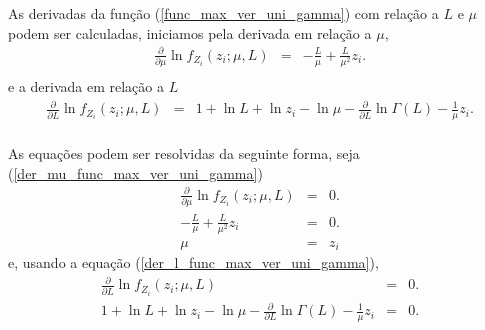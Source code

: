 \documentclass[remotesensing,article,submit,moreauthors,pdftex]{Definitions/mdpi}
\begin{document}
As derivadas da função (\ref{func_max_ver_uni_gamma}) com relação a $L$ e $\mu$ podem ser calculadas, iniciamos pela derivada em relação a $\mu$,
\begin{equation}\label{der_mu_func_max_ver_uni_gamma}
\begin{array}{ccc}
	\frac{\partial}{\partial \mu}\ln f_{Z_{i}}(z_{i};\mu,L)&=& -\frac{L}{\mu} + \frac{L}{\mu^2} z_i.\\
\end{array}
\end{equation}
e a derivada em relação a $L$
\begin{equation}\label{der_l_func_max_ver_uni_gamma}
\begin{array}{ccc}
	\frac{\partial}{\partial L}\ln f_{Z_{i}}(z_{i};\mu,L)&=&1 + \ln L + \ln z_{i}-\ln \mu -\frac{\partial}{\partial L}\ln \Gamma(L)-\frac{1}{\mu} z_i.\\
\end{array}
\end{equation}

As equações podem ser resolvidas da seguinte forma, seja (\ref{der_mu_func_max_ver_uni_gamma}) 
\begin{equation}\label{der_mu_func_max_ver_uni_gamma_equal_to_zero}
\begin{array}{ccc}
\frac{\partial}{\partial \mu}\ln f_{Z_{i}}(z_{i};\mu,L)&=&0.\\
	 -\frac{L}{\mu} + \frac{L}{\mu^2} z_i&=&0.\\
	 \mu &=& z_i
\end{array}
\end{equation}
e, usando a equação (\ref{der_l_func_max_ver_uni_gamma}),
\begin{equation}\label{der_l_func_max_ver_uni_gamma_equal_to_zero}
\begin{array}{ccc}
	\frac{\partial}{\partial L}\ln f_{Z_{i}}(z_{i};\mu,L)&=&0.\\
	1 + \ln L + \ln z_{i}-\ln \mu -\frac{\partial}{\partial L}\ln \Gamma(L)-\frac{1}{\mu} z_i&=&0.\\
\end{array}
\end{equation}
\end{document}
